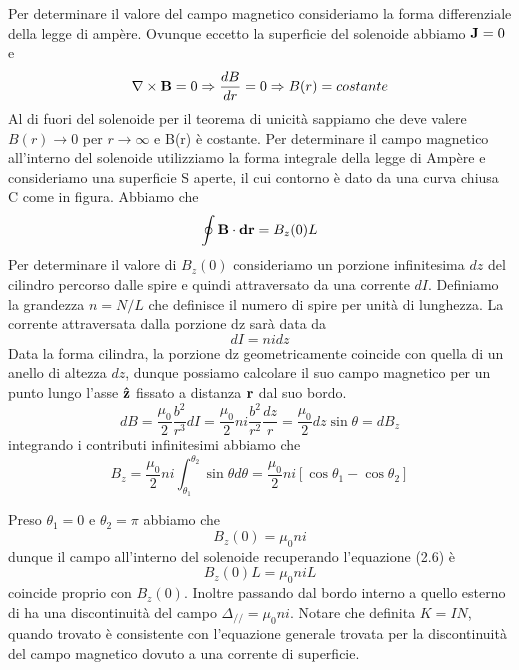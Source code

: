 Per determinare il valore del campo magnetico consideriamo la forma differenziale della legge di amp\`ere. Ovunque eccetto la superficie del solenoide abbiamo $\bold{J} =0$ e 
	\begin{equation*}
		\nabla \times \bold{B} = 0 \Rightarrow \frac{dB}{dr} = 0 \Rightarrow B(r) = costante
	\end{equation*} 
Al di fuori del solenoide per il teorema di unicit\`a sappiamo che deve valere $B(r) \to 0$ per $r \to \infty $ e B(r) \`e costante. Per determinare il campo magnetico all'interno del solenoide utilizziamo la forma integrale della legge di Amp\`ere e consideriamo una superficie S aperte, il cui contorno \`e dato da una curva chiusa C come in figura. Abbiamo che 
\begin{equation}
	\oint \bold{B} \cdot \bold{dr} = B_z(0)L
\end{equation} 
Per determinare il valore di $B_z(0)$ consideriamo un porzione infinitesima $dz$ del cilindro percorso dalle spire e quindi attraversato da una corrente $dI$. Definiamo la grandezza $n = N/ L$ che definisce il numero di spire per unit\`a di lunghezza. La corrente attraversata dalla porzione dz sar\`a data da 
\begin{equation*}
	dI = nidz
\end{equation*}
Data la forma cilindra, la porzione dz geometricamente coincide con quella di un anello di altezza $dz$, dunque possiamo calcolare il suo campo magnetico per un punto lungo l'asse $\bold{\hat{z}}$ fissato a distanza $\bold{r}$ dal suo bordo.
\begin{equation*}
	dB = \frac{\mu_0}{2}\frac{b^2}{r^3}dI = \frac{\mu_0}{2}ni \frac{b^2}{r^2}\frac{dz}{r} = \frac{\mu_0}{2}dz\sin\theta = dB_z
\end{equation*}
integrando i contributi infinitesimi abbiamo che 
\begin{equation*}
	B_z =  \frac{\mu_0}{2}ni \int_{\theta_1}^{\theta_2}\sin \theta d\theta = \frac{\mu_0}{2}ni[\cos\theta_1-\cos\theta_2]
\end{equation*}

Preso $\theta_1 = 0$ e $\theta_2 = \pi$ abbiamo che 
\begin{equation*}
	B_z(0) = \mu_0 ni
\end{equation*}
dunque il campo all'interno del solenoide recuperando l'equazione (2.6) \`e 
\begin{equation*}
	B_z(0)L = \mu_0niL
\end{equation*}
coincide proprio con $B_z(0)$. Inoltre passando dal bordo interno a quello esterno di ha una discontinuit\`a del campo $\Delta_{//} = \mu_0ni$. Notare che definita $K = IN$, quando trovato \`e consistente con l'equazione generale trovata per la discontinuit\`a del campo magnetico dovuto a una corrente di superficie.


